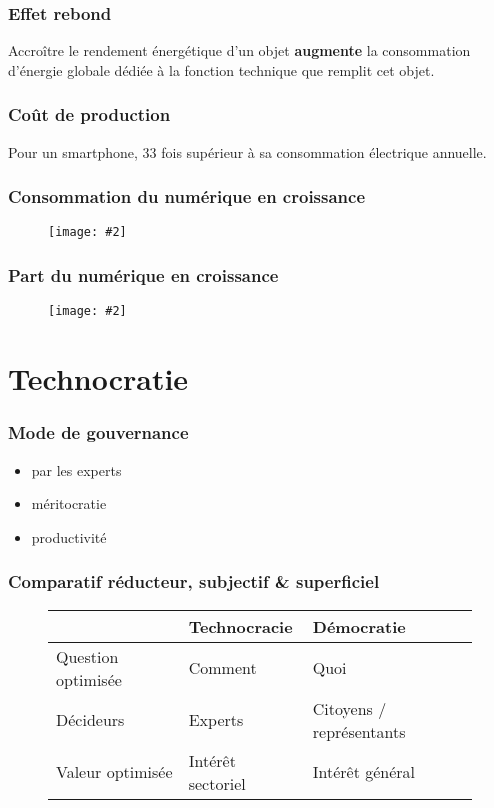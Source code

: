 \documentclass[10pt]{beamer}
\newcommand{\imgtw}[2][1]{%
  \begin{figure}%
    \centering%
    \texttt{[image: \#2]}%
  \end{figure}%
}
\begin{document}
\begin{frame}
  \frametitle{Effet rebond}

  Accroître le rendement énergétique d'un objet \textbf{augmente} la
  consommation d’énergie globale dédiée à la fonction technique que
  remplit cet objet.
\end{frame}

\begin{frame}
  \frametitle{Coût de production}

  Pour un smartphone, 33 fois supérieur à sa consommation électrique
  annuelle.

\end{frame}

\begin{frame}
  \frametitle{Consommation du numérique en croissance}
  \imgtw{consumption}
\end{frame}

\begin{frame}
  \frametitle{Part du numérique en croissance}
  \imgtw[.7]{share}
\end{frame}


\section{Technocratie}
\label{sec:technocratie}

\begin{frame}
  \frametitle{Mode de gouvernance}
  \begin{itemize}[<+->]
  \item par les experts
  \item méritocratie
  \item productivité
  \end{itemize}
\end{frame}

\begin{frame}
  \frametitle{Comparatif réducteur, subjectif \& superficiel}

  \begin{figure}
    \centering
    \begin{tabular}{lll}
      \toprule
                         & Technocracie                   & Démocratie               \\
      \midrule
      Question optimisée & Comment                        & Quoi                     \\
      Décideurs          & Experts                        & Citoyens / représentants \\
      Valeur optimisée   & Intérêt sectoriel              & Intérêt général          \\
      \bottomrule
    \end{tabular}
  \end{figure}
\end{frame}
\end{document}
